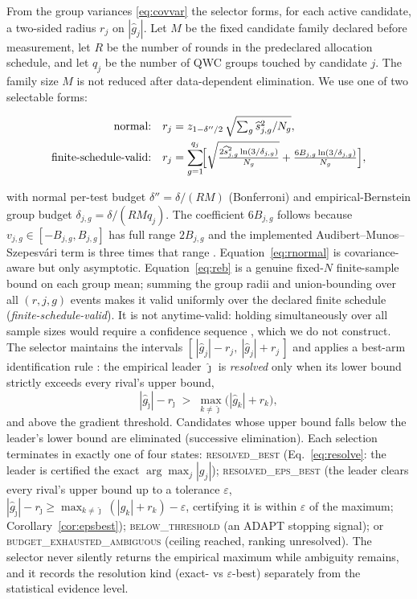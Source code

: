 \documentclass[aps,pra,reprint,superscriptaddress,nofootinbib,floatfix]{revtex4-2}
\begin{document}
From the group variances \eqref{eq:covvar} the selector forms, for each active candidate, a two-sided radius $r_j$ on $|\widehat g_j|$. Let $M$ be the fixed candidate family declared before measurement, let $R$ be the number of rounds in the predeclared allocation schedule, and let $q_j$ be the number of QWC groups touched by candidate $j$. The family size $M$ is not reduced after data-dependent elimination. We use one of two selectable forms:
\begin{widetext}
\begin{align}
\text{normal:}\quad & r_j=z_{1-\delta''/2}\,\sqrt{\textstyle\sum_g \widehat s^2_{j,g}/N_g},
\label{eq:rnormal}\\
\text{finite-schedule-valid:}\quad & r_j=\sum_{g=1}^{q_j}\!\Bigl[\sqrt{\tfrac{2\widehat s^2_{j,g}\ln(3/\delta_{j,g})}{N_g}}+\tfrac{6B_{j,g}\ln(3/\delta_{j,g})}{N_g}\Bigr],
\label{eq:reb}
\end{align}
\end{widetext}
with normal per-test budget $\delta''=\delta/(RM)$ (Bonferroni) and empirical-Bernstein group budget $\delta_{j,g}=\delta/(RMq_j)$. The coefficient $6B_{j,g}$ follows because $v_{j,g}\in[-B_{j,g},B_{j,g}]$ has full range $2B_{j,g}$ and the implemented Audibert--Munos--Szepesv\'ari term is three times that range \cite{audibert2009exploration}. Equation~\eqref{eq:rnormal} is covariance-aware but only asymptotic. Equation~\eqref{eq:reb} is a genuine fixed-$N$ finite-sample bound on each group mean; summing the group radii and union-bounding over all $(r,j,g)$ events makes it valid uniformly over the declared finite schedule (\emph{finite-schedule-valid}). It is not anytime-valid: holding simultaneously over all sample sizes would require a confidence sequence \cite{howard2021timeuniform}, which we do not construct. The selector maintains the intervals $[\,|\widehat g_j|-r_j,\ |\widehat g_j|+r_j\,]$ and applies a best-arm identification rule \cite{evendar2006action,jamieson2014best}: the empirical leader $\hat\jmath$ is \emph{resolved} only when its lower bound strictly exceeds every rival's upper bound,
\begin{equation}
|\widehat g_{\hat\jmath}|-r_{\hat\jmath}\;>\;\max_{k\neq\hat\jmath}\bigl(|\widehat g_k|+r_k\bigr),
\label{eq:resolve}
\end{equation}
and above the gradient threshold. Candidates whose upper bound falls below the leader's lower bound are eliminated (successive elimination). Each selection terminates in exactly one of four states: \textsc{resolved\_best} (Eq.~\eqref{eq:resolve}: the leader is certified the exact $\arg\max_j|g_j|$); \textsc{resolved\_eps\_best} (the leader clears every rival's upper bound up to a tolerance $\varepsilon$, $|\widehat g_{\hat\jmath}|-r_{\hat\jmath}\ge\max_{k\neq\hat\jmath}(|\widehat g_k|+r_k)-\varepsilon$, certifying it is within $\varepsilon$ of the maximum; Corollary~\ref{cor:epsbest}); \textsc{below\_threshold} (an ADAPT stopping signal); or \textsc{budget\_exhausted\_ambiguous} (ceiling reached, ranking unresolved). The selector never silently returns the empirical maximum while ambiguity remains, and it records the resolution kind (exact- vs $\varepsilon$-best) separately from the statistical evidence level.
\end{document}

